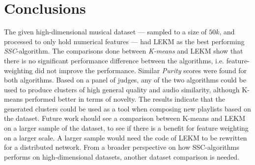 \documentclass[../report.tex]{subfiles}
\begin{document}
\chapter{Conclusions}
The given high-dimensional musical dataset --- sampled to a size of $50k$, and processed to only hold numerical features --- had LEKM as the best performing \textit{SSC}-algorithm. The comparisons done between \textit{K-means} and LEKM show that there is no significant performance difference between the algorithms, i.e. feature-weighting did not improve the performance. Similar \textit{Purity} scores were found for both algorithms. Based on a panel of judges, any of the two algorithms could be used to produce clusters of high general quality and audio similarity, although K-means performed better in terms of novelty. The results indicate that the generated clusters could be used as a tool when composing new playlists based on the dataset. Future work should see a comparison between K-means and LEKM on a larger sample of the dataset, to see if there is a benefit for feature weighting on a larger scale. A larger sample would need the code of LEKM to be rewritten for a distributed network. From a broader perspective on how SSC-algorithms performs on high-dimensional datasets, another dataset comparison is needed.
\end{document}
